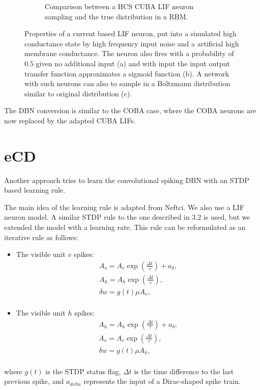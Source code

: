 \begin{figure}
\begin{subfigure}[t]{.5\textwidth}
  		\caption{Comparison between a HCS CUBA LIF neuron sampling and the true distribution in a RBM.}
  		\label{fig:sub2}
	\end{subfigure}
	\caption{Properties of a current based LIF neuron, put into a simulated high conductance state by high frequency input noise and a artificial high membrane conductance. The neuron also fires with a probability of $0.5$ given no additional input (a) and with input the input output transfer function approximates a sigmoid function (b). A network with such neurons can also to sample in a Boltzmann distribution similar to original distribution (c).}
	\label{fig:cubahcs}
\end{figure}
The DBN conversion is similar to the COBA case, where the COBA neurons are now replaced by the adapted CUBA LIFs.

\section{eCD}

Another approach tries to learn the convolutional spiking DBN with an STDP based learning rule. 

The main idea of the learning rule is adapted from Neftci.
We also use a LIF neuron model.
A similar STDP rule to the one described in 3.2 is used, but we extended the model with a learning rate. 
This rule can be reformulated as an iterative rule as follows:
\begin{itemize}
\item The visible unit $v$ spikes: 
\[
\begin{split}
A_v = A_v \exp(\frac{\Delta t}{\tau}) + a_{\delta} ,\\
A_h = A_h \exp(\frac{\Delta t}{\tau}) ,\\
\delta w = g(t) \mu A_v  ,\\
\end{split}
\]
\item The visible unit $h$ spikes: 
\[
\begin{split}
A_h = A_h \exp(\frac{\Delta t}{\tau}) + a_{\delta} ,\\
A_v = A_v \exp(\frac{\Delta t}{\tau}) ,\\
\delta w = g(t) \mu A_h  ,\\
\end{split}
\]
\end{itemize}
where $g(t)$ is the STDP status flag, $\Delta t$ is the time difference to the last previous spike, and $a_{delta}$ represents the input of a Dirac-shaped spike train.


